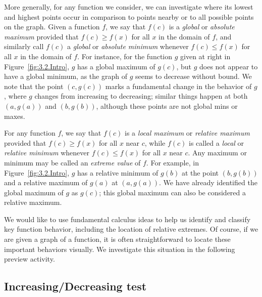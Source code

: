 More generally, for any function we consider, we can investigate where its lowest and highest points occur in comparison to points nearby or to all possible points on the graph.  Given a function $f$, we say that $f(c)$ is a \emph{global} or \emph{absolute maximum}    provided that $f(c) \ge f(x)$ for all $x$ in the domain of $f$, and similarly call $f(c)$ a \emph{global}  or \emph{absolute minimum}  whenever $f(c) \le f(x)$ for all $x$ in the domain of $f$.  For instance, for the function $g$ given at right in Figure~\ref{fig:3.2.Intro}, $g$ has a global maximum of $g(c)$, but $g$ does not appear to have a global minimum, as the graph of $g$ seems to decrease without bound.  We note that the point $(c,g(c))$ marks a fundamental change in the behavior of $g$, where $g$ changes from increasing to decreasing; similar things happen at both $(a,g(a))$ and $(b,g(b))$, although these points are not global mins or maxes.  

For any function $f$, we say that $f(c)$ is a \emph{local maximum}  or \emph{relative maximum}  provided that $f(c) \ge f(x)$ for all $x$ near $c$, while $f(c)$ is called a \emph{local}  or \emph{relative minimum}  whenever $f(c) \le f(x)$ for all $x$ near $c$.  Any maximum or minimum may be called an \emph{extreme value}  of $f$.  For example, in Figure~\ref{fig:3.2.Intro}, $g$ has a relative minimum of $g(b)$ at the point $(b,g(b))$ and a relative maximum of $g(a)$ at $(a,g(a))$.  We have already identified the global maximum of $g$ as $g(c)$; this global maximum can also be considered a relative maximum.  

We would like to use fundamental calculus ideas to help us identify and classify key function behavior, including the location of relative extremes.  Of course, if we are given a graph of a function, it is often straightforward to locate these important behaviors visually.  We investigate this situation in the following preview activity.


\subsection*{Increasing/Decreasing test}

